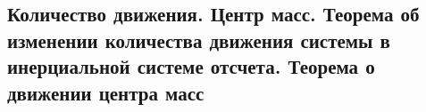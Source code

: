 

\subsection{Количество движения. Центр масс. Теорема об изменении количества движения системы в инерциальной системе отсчета. Теорема о движении центра масс}




